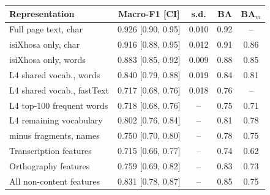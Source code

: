 \begin{tabular}{@{}lcccc@{}}
\toprule
Representation & Macro-F1 [CI] & s.d. & BA & BA$_m$ \\
\midrule
Full page text, char & 0.926 [0.90, 0.95] & 0.010 & 0.92 & -- \\
isiXhosa only, char & 0.916 [0.88, 0.95] & 0.012 & 0.91 & 0.86 \\
isiXhosa only, words & 0.883 [0.85, 0.92] & 0.009 & 0.88 & 0.85 \\
L4 shared vocab., words & 0.840 [0.79, 0.88] & 0.019 & 0.84 & 0.81 \\
L4 shared vocab., fastText & 0.717 [0.68, 0.76] & 0.018 & 0.76 & -- \\
L4 top-100 frequent words & 0.718 [0.68, 0.76] & -- & 0.75 & 0.71 \\
L4 remaining vocabulary & 0.802 [0.76, 0.84] & -- & 0.81 & 0.78 \\
\quad minus fragments, names & 0.750 [0.70, 0.80] & -- & 0.78 & 0.75 \\
Transcription features & 0.715 [0.66, 0.77] & -- & 0.74 & 0.62 \\
Orthography features & 0.759 [0.69, 0.82] & -- & 0.83 & 0.73 \\
All non-content features & 0.831 [0.78, 0.87] & -- & 0.85 & 0.75 \\
\bottomrule
\end{tabular}
